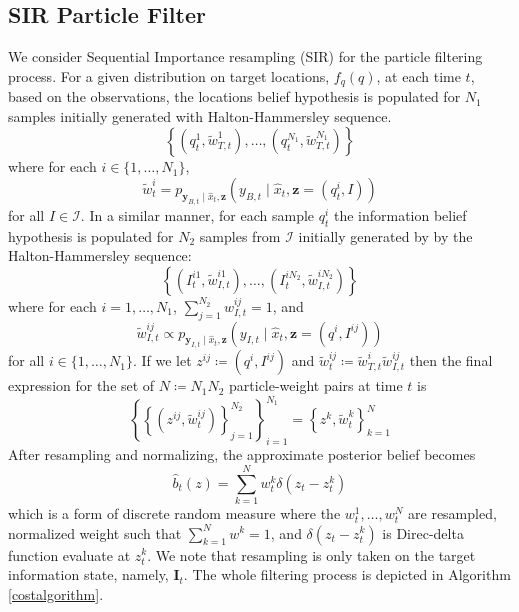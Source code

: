 \documentclass[journal]{IEEEtran}
\begin{document}
\subsection{SIR Particle Filter}
We consider Sequential Importance resampling (SIR) \cite{arulampalam2002tutorial} for the particle filtering process.
For a given distribution on target locations, $f_{q}(q)$,
at each time $t$, based on the observations, the locations belief hypothesis is populated for 
 $N_1$ samples initially generated with Halton-Hammersley sequence.
\[
\left\{ \left( q_t^{1},\widetilde{w}_{T,t}^{1}\right),\dots,\left(q_t^{N_1},\widetilde{w}_{T,t}^{N_1}\right)\right\}
\]
where for each $i \in \lbrace 1,\dots,N_1 \rbrace$,
\[
\widetilde{w}_t^{i} =
p_{\bm{y}_{B,t} \mid
	\hat{x}_{t},\bm{z}}\left(
y_{B,t} \mid
\hat{x}_{t},\bm{z}=(q_t^i,I)\right) 
\]
for all $I \in \mathcal{I}$. In a similar manner, for each sample $q_t^{i}$
the information belief hypothesis is populated for $N_2$ samples from $\mathcal{I}$ initially generated by by the Halton-Hammersley sequence:
\[
\left\{
\left(
I_t^{i1},\widetilde{w}_{I,t}^{i1}\right),\dots,
\left(I_t^{iN_2},\widetilde{w}_{I,t}^{iN_2}\right)
\right\}
\]
where for each $i = 1,\dots,N_1$, $\sum_{j=1}^{N_2} w_{I,t}^{ij} = 1$, 
and 
\[
\widetilde{w}_{I,t}^{ij} \propto
p_{\bm{y}_{I,t} \mid
	\hat{x}_{t},\bm{z}}\left(
y_{I,t} \mid
\hat{x}_{t},\bm{z}=(q^i,I^{ij})\right)
\]
for all $i \in \lbrace 1,\dots,N_1 \rbrace$.
If we let $z^{ij} \coloneqq (q^{i},I^{ij})$ and $\widetilde{w}_t^{ij} \coloneqq \widetilde{w}_{T,t}^{i}\widetilde{w}_{I,t}^{ij}$ then the final expression for the set of $N\coloneqq N_1N_2$ particle-weight pairs at time $t$ is
\[
\left\{
\left\{
(z^{ij},\widetilde{w}_t^{ij})
\right\}_{j=1}^{N_2}
\right\}_{i=1}^{N_1}
= \left\{
z^k,\widetilde{w}_t^k
\right\}_{k=1}^N
\]
%
After resampling and normalizing, the approximate posterior belief becomes
\[
\hat{b}_t(z) = \sum_{k=1}^{N} 
w_t^{k} \delta(z_t - z_t^{k})
\]
which is a form of discrete random measure where the $w_t^1,\dots,w_t^N$ are resampled, normalized weight such that $\sum_{k=1}^{N} w^{k} = 1$, and $\delta(z_t - z_t^{k})$ is Direc-delta function evaluate at $z_t^{k}$. We note that resampling is only taken on the target information state, namely, $\bm{I}_t$.
The whole filtering process is depicted in Algorithm \ref{costalgorithm}.
\end{document}
